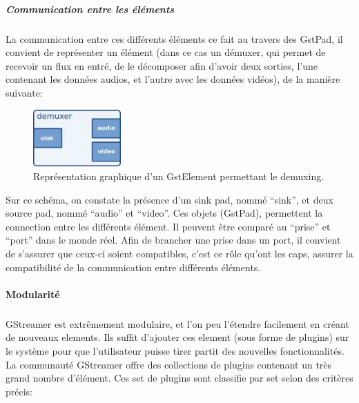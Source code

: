 \subparagraph{Communication entre les éléments}

\subparagraph{}

La communication entre ces différents éléments ce fait au travers des
GstPad, il convient de représenter un élément (dans ce cas un démuxer,
qui permet de recevoir un flux en entré, de le décomposer afin d'avoir
deux sorties, l'une contenant les données audios, et l'autre avec les
données vidéos), de la manière suivante:

\begin{figure} [H]

  \begin{center}

    \includegraphics[width=0.30\textwidth]{images/gstdemuxer}

  \end{center}

  \caption{Représentation graphique d'un GstElement permettant le
  demuxing.}

  \label{Yes}

\end{figure}

Sur ce schéma, on constate la présence d'un sink pad, nommé ``sink'',
et deux source pad, nommé ``audio'' et ``video''. Ces objets (GstPad),
permettent la connection entre les différents élément. Il peuvent être
comparé au ``prise'' et ``port'' dans le monde réel.  Afin de brancher
une prise dans un port, il convient de s'assurer que ceux-ci soient
compatibles, c'est ce rôle qu'ont les caps, assurer la compatibilité
de la communication entre différents éléments.

\paragraph {Modularité}

\subparagraph{}

GStreamer est extrêmement modulaire, et l'on peu l'étendre facilement
en créant de nouveaux elements. Ils suffit d'ajouter ces element (sous
forme de plugins) sur le système pour que l'utilisateur puisse tirer
partit des nouvelles fonctionnalités. La communauté GStreamer offre des
collections de plugins contenant un très grand nombre d'élément. Ces
set de plugins sont classifie par set selon des critères précis:

